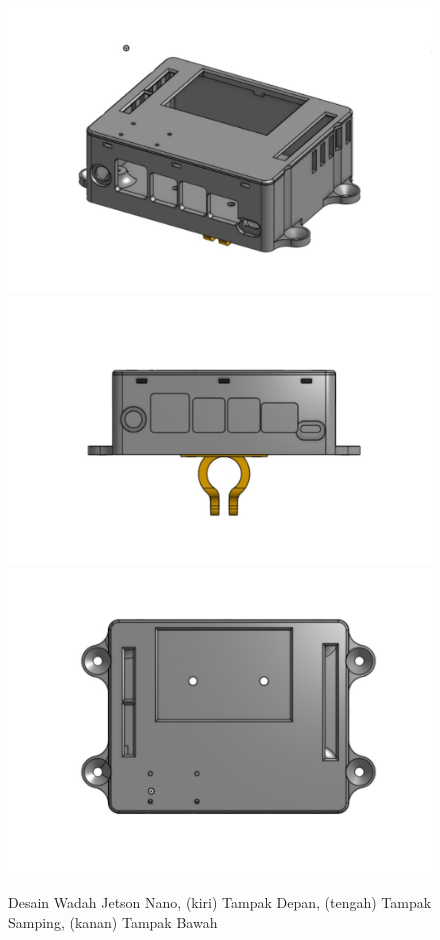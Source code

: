 \begin{figure}[htbp]
  \centering

  \includegraphics[scale=0.13]{gambar/bab3-tampak-depan-case-jnano.jpeg}
  \includegraphics[scale=0.13]{gambar/bab3-tampak-samping-case-jnano.jpeg}
  \includegraphics[scale=0.13]{gambar/bab3-tampak-bawah-case-jnano.jpeg}

  \caption{\centering Desain Wadah Jetson Nano, (kiri) Tampak Depan, (tengah) Tampak Samping, (kanan) Tampak Bawah}
  \label{fig:designcontainerjetson}
\end{figure}

